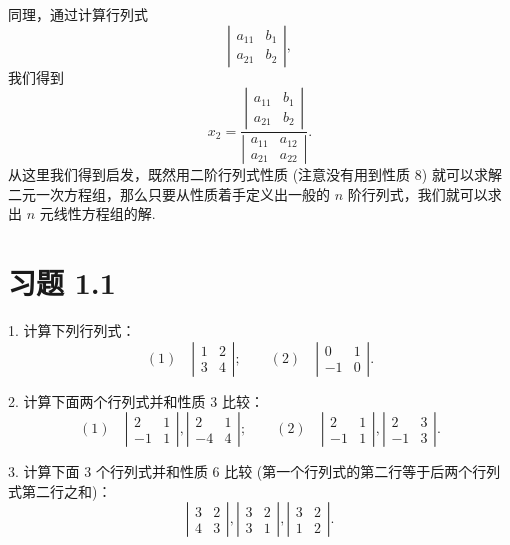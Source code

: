 \documentclass[UTF8,12pt,a4paper,fontset=fandol]{ctexart}
\begin{document}
同理，通过计算行列式
\[
\left|\begin{array}{cc}
a_{11} & b_1\\
a_{21} & b_2
\end{array}\right|,
\]
我们得到
\[
x_2=
\frac{
\left|\begin{array}{cc}
a_{11} & b_1\\
a_{21} & b_2
\end{array}\right|}
{\left|\begin{array}{cc}
a_{11} & a_{12}\\
a_{21} & a_{22}
\end{array}\right|}.
\]
从这里我们得到启发，既然用二阶行列式性质 (注意没有用到性质 8) 就可以求解二元一次方程组，那么只要从性质着手定义出一般的 $n$ 阶行列式，我们就可以求出 $n$ 元线性方程组的解.

\section*{习题 1.1}

1. 计算下列行列式：
\[
(1)\quad
\left|\begin{array}{cc}
1 & 2\\
3 & 4
\end{array}\right|;\qquad
(2)\quad
\left|\begin{array}{cc}
0 & 1\\
-1 & 0
\end{array}\right|.
\]

2. 计算下面两个行列式并和性质 3 比较：
\[
(1)\quad
\left|\begin{array}{cc}
2 & 1\\
-1 & 1
\end{array}\right|,
\left|\begin{array}{cc}
2 & 1\\
-4 & 4
\end{array}\right|;\qquad
(2)\quad
\left|\begin{array}{cc}
2 & 1\\
-1 & 1
\end{array}\right|,
\left|\begin{array}{cc}
2 & 3\\
-1 & 3
\end{array}\right|.
\]

3. 计算下面 3 个行列式并和性质 6 比较 (第一个行列式的第二行等于后两个行列式第二行之和)：
\[
\left|\begin{array}{cc}
3 & 2\\
4 & 3
\end{array}\right|,
\left|\begin{array}{cc}
3 & 2\\
3 & 1
\end{array}\right|,
\left|\begin{array}{cc}
3 & 2\\
1 & 2
\end{array}\right|.
\]
\end{document}
